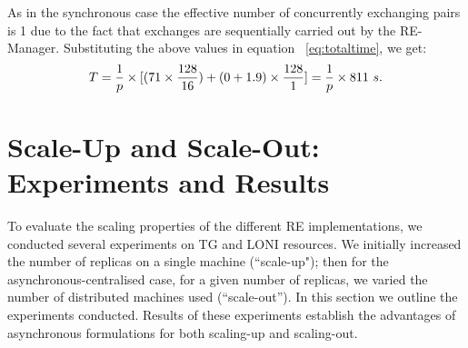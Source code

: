 \documentclass{rspublic}
\newcommand{\alnote}[1]{ {\textcolor{blue} { ***andre: #1 }}}
\newcommand{\athotanote}[1]{ {\textcolor{green} { ***athota: #1 }}}
\newcommand{\alnote}[1]{}
\newcommand{\athotanote}[1]{}
\begin{document}



As in the synchronous case the effective number of concurrently
exchanging pairs is 1 due to the fact that exchanges are sequentially
carried out by the RE-Manager.  Substituting the above values in
equation ~\ref{eq:totaltime}, we get:
\begin{eqnarray}
T=  {1 \over p} \times {[ {(71\times {128\over 16}}) + (0 + 1.9)\times {128 \over 1}]} = {1 \over p} \times 811~s.
\label{eq:cent}
\end{eqnarray}

\section{Scale-Up and Scale-Out: Experiments and
  Results}\label{sec:performance}

To evaluate the scaling properties of the different RE
implementations, we conducted several experiments on TG and LONI
resources. We initially increased the number of replicas on a single
machine (``scale-up"); then for the asynchronous-centralised case, for
a given number of replicas, we varied the number of distributed
machines used (``scale-out''). In this section we outline the
experiments conducted. Results of these experiments establish the
advantages of asynchronous formulations for both scaling-up and
scaling-out.

\end{document}

